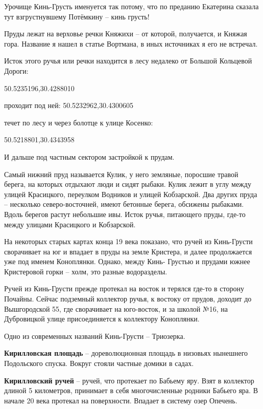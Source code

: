 Урочище Кинь-Грусть именуется так потому, что по преданию Екатерина сказала тут взгрустнувшему Потёмкину – кинь грусть!

Пруды лежат на верховье речки Княжихи – от которой, получается, и Княжая гора. Название я нашел в статье Вортмана, в иных источниках я его не встречал. 

Исток этого ручья или речки находится в лесу недалеко от Большой Кольцевой Дороги:

50.5235196,30.4288010

проходит под ней: 50.5232962,30.4300605

течет по лесу и через болотце к улице Косенко:

50.5218801,30.4343958

И дальше под частным сектором застройкой к прудам.

Самый нижний пруд называется Кулик, у него земляные, поросшие травой берега, на которых отдыхают люди и сидят рыбаки. Кулик лежит в углу между улицей Красицкого, переулком Водников и улицей Кобзарской. Два других пруда – несколько северо-восточней, имеют бетонные берега, обсижены рыбаками. Вдоль берегов растут небольшие ивы. Исток ручья, питающего пруды, где-то между улицами Красицкого и Кобзарской.

На некоторых старых картах конца 19 века показано, что ручей из Кинь-Грусти сворачивает на юг и впадает в пруды на земле Кристера, и далее продолжается уже под именем Коноплянки. Однако, между Кинь- Грустью и прудами южнее Кристеровой горки – холм, это разные водоразделы.

Ручей из Кинь-Грусти прежде протекал на восток и терялся где-то в сторону Почайны. Сейчас подземный коллектор ручья, к востоку от прудов, доходит до Вышгородской 55, где сворачивает на юго-восток, и за школой №16, на Дубровицкой улице присоединяется к коллектору Коноплянки.

Одно из современных названий Кинь-Грусти – Триозерка.\\

\medskip

\textbf{Кирилловская площадь} – дореволюционная площадь в низовьях нынешнего Подольского спуска. Вокруг стояли частные домики в садах.\\

\medskip

\textbf{Кирилловский ручей} – ручей, что протекает по Бабьему яру. Взят в коллектор длиной 5 километров, принимает в себя многочисленные родники Бабьего яра. В начале 20 века протекал на поверхности. Впадает в систему озер Опечень.\\

